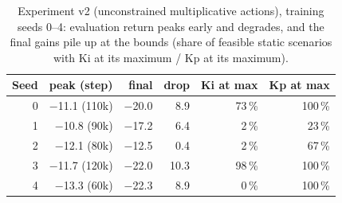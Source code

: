 \begin{table}[t]
\centering
\small
\caption{Experiment v2 (unconstrained multiplicative actions), training seeds 0--4: evaluation return peaks early and degrades, and the final gains pile up at the bounds (share of feasible static scenarios with Ki at its maximum / Kp at its maximum).}
\label{tab:v2}
\begin{tabular}{rrrrrr}
\toprule
Seed & peak (step) & final & drop & Ki at max & Kp at max\\
\midrule
0 & $-$11.1 (110k) & $-$20.0 & 8.9 & 73\,\% & 100\,\%\\
1 & $-$10.8 (90k) & $-$17.2 & 6.4 & 2\,\% & 23\,\%\\
2 & $-$12.1 (80k) & $-$12.5 & 0.4 & 2\,\% & 67\,\%\\
3 & $-$11.7 (120k) & $-$22.0 & 10.3 & 98\,\% & 100\,\%\\
4 & $-$13.3 (60k) & $-$22.3 & 8.9 & 0\,\% & 100\,\%\\
\bottomrule
\end{tabular}
\end{table}

